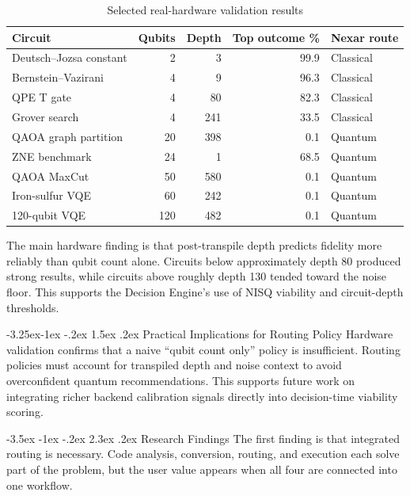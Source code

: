 \documentclass[12pt,a4paper]{report}
\makeatletter
\renewcommand\section{\@startsection{section}{1}{\z@}%
  {-3.5ex \@plus -1ex \@minus -.2ex}%
  {2.3ex \@plus.2ex}%
  {\normalfont\bfseries\fontsize{12pt}{16pt}\selectfont}}
\renewcommand\subsection{\@startsection{subsection}{2}{\z@}%
  {-3.25ex\@plus -1ex \@minus -.2ex}%
  {1.5ex \@plus .2ex}%
  {\normalfont\bfseries\fontsize{12pt}{16pt}\selectfont}}
\makeatother
\begin{document}
\begin{table}[H]
\centering
\caption{Selected real-hardware validation results}
\begin{tabular}{lrrrl}
\toprule
\textbf{Circuit} & \textbf{Qubits} & \textbf{Depth} & \textbf{Top outcome \%} & \textbf{Nexar route} \\
\midrule
Deutsch--Jozsa constant & 2 & 3 & 99.9 & Classical \\
Bernstein--Vazirani & 4 & 9 & 96.3 & Classical \\
QPE T gate & 4 & 80 & 82.3 & Classical \\
Grover search & 4 & 241 & 33.5 & Classical \\
QAOA graph partition & 20 & 398 & 0.1 & Quantum \\
ZNE benchmark & 24 & 1 & 68.5 & Quantum \\
QAOA MaxCut & 50 & 580 & 0.1 & Quantum \\
Iron-sulfur VQE & 60 & 242 & 0.1 & Quantum \\
120-qubit VQE & 120 & 482 & 0.1 & Quantum \\
\bottomrule
\end{tabular}
\end{table}

The main hardware finding is that post-transpile depth predicts fidelity more reliably than qubit count alone. Circuits below approximately depth 80 produced strong results, while circuits above roughly depth 130 tended toward the noise floor. This supports the Decision Engine's use of NISQ viability and circuit-depth thresholds.

\subsection{Practical Implications for Routing Policy}
Hardware validation confirms that a naive ``qubit count only'' policy is insufficient. Routing policies must account for transpiled depth and noise context to avoid overconfident quantum recommendations. This supports future work on integrating richer backend calibration signals directly into decision-time viability scoring.

\section{Research Findings}
The first finding is that integrated routing is necessary. Code analysis, conversion, routing, and execution each solve part of the problem, but the user value appears when all four are connected into one workflow.
\end{document}
